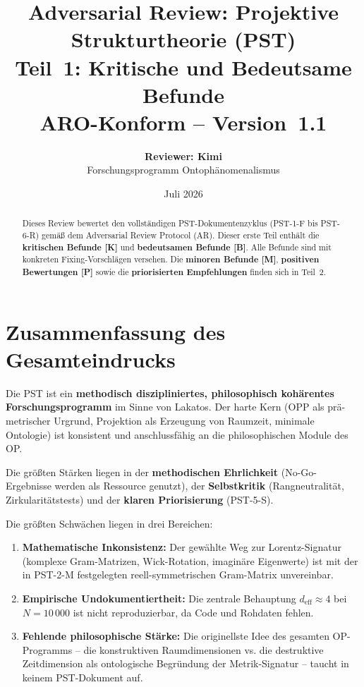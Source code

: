 \documentclass[11pt,a4paper]{article}
\title{
  \textbf{Adversarial Review: Projektive Strukturtheorie (PST)}\\[0.4em]
  {\large Teil~1: Kritische und Bedeutsame Befunde}\\[0.5em]
  {\normalsize ARO-Konform -- Version~1.1}
}
\author{
  \textbf{Reviewer: Kimi}\\
  \small Forschungsprogramm Ontophänomenalismus
}
\date{Juli 2026}
\begin{document}
\maketitle

\begin{abstract}
Dieses Review bewertet den vollständigen PST-Dokumentenzyklus
(PST-1-F bis PST-6-R) gemäß dem Adversarial Review Protocol (AR).
Dieser erste Teil enthält die \textbf{kritischen Befunde [K]} und
\textbf{bedeutsamen Befunde [B]}. Alle Befunde sind mit konkreten
Fixing-Vorschlägen versehen. Die \textbf{minoren Befunde [M]},
\textbf{positiven Bewertungen [P]} sowie die \textbf{priorisierten
Empfehlungen} finden sich in Teil~2.
\end{abstract}

\tableofcontents
\newpage

\section{Zusammenfassung des Gesamteindrucks}

Die PST ist ein \textbf{methodisch diszipliniertes, philosophisch
kohärentes Forschungsprogramm} im Sinne von Lakatos. Der harte Kern
(OPP als prä-metrischer Urgrund, Projektion als Erzeugung von
Raumzeit, minimale Ontologie) ist konsistent und anschlussfähig an
die philosophischen Module des OP.

Die größten Stärken liegen in der \textbf{methodischen
Ehrlichkeit} (No-Go-Ergebnisse werden als Ressource genutzt), der
\textbf{Selbstkritik} (Rangneutralität, Zirkularitätstests) und
der \textbf{klaren Priorisierung} (PST-5-S).

Die größten Schwächen liegen in drei Bereichen:
\begin{enumerate}
  \item \textbf{Mathematische Inkonsistenz:} Der gewählte Weg zur
    Lorentz-Signatur (komplexe Gram-Matrizen, Wick-Rotation,
    imaginäre Eigenwerte) ist mit der in PST-2-M festgelegten
    reell-symmetrischen Gram-Matrix unvereinbar.
  \item \textbf{Empirische Undokumentiertheit:} Die zentrale
    Behauptung $d_{\text{eff}} \approx 4$ bei $N = 10\,000$ ist
    nicht reproduzierbar, da Code und Rohdaten fehlen.
  \item \textbf{Fehlende philosophische Stärke:} Die originellste
    Idee des gesamten OP-Programms -- die konstruktiven
    Raumdimensionen vs. die destruktive Zeitdimension als
    ontologische Begründung der Metrik-Signatur -- taucht in
    keinem PST-Dokument auf.
\end{enumerate}
\end{document}
